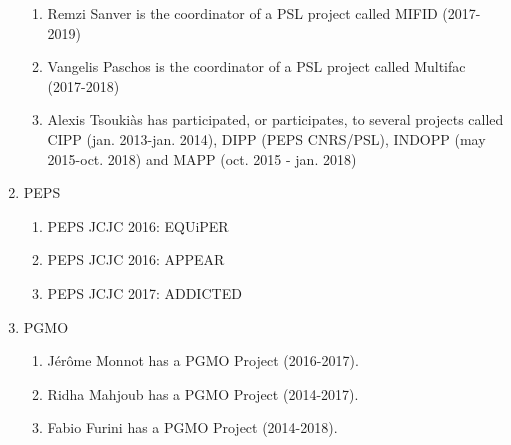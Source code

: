 \documentclass[version=last, pagesize, twoside=semi, DIV=calc, 12pt, a4paper, french, english, bibliography=totoc]{scrartcl}
\begin{document}
\begin{enumerate}
\begin{enumerate}
\item Remzi Sanver is the coordinator of a PSL project called MIFID (2017-2019)
\item  Vangelis Paschos is the coordinator of a PSL project called Multifac (2017-2018)
\item  Alexis Tsouki\`as has participated, or participates, to several 
projects called CIPP (jan. 2013-jan. 2014), DIPP (PEPS CNRS/PSL), INDOPP (may 2015-oct. 2018) and MAPP (oct. 2015 - jan. 2018)
\end{enumerate}
\item PEPS
\begin{enumerate}
\item PEPS JCJC 2016: EQUiPER %
\item PEPS JCJC 2016: APPEAR %
\item PEPS JCJC 2017: ADDICTED %
\end{enumerate}
\item PGMO
\begin{enumerate}
\item J\'er\^ome Monnot has a PGMO Project  (2016-2017).
\item Ridha Mahjoub has a PGMO Project (2014-2017).
\item Fabio Furini has a PGMO Project (2014-2018).
\end{enumerate}

\end{enumerate}
\end{document}
